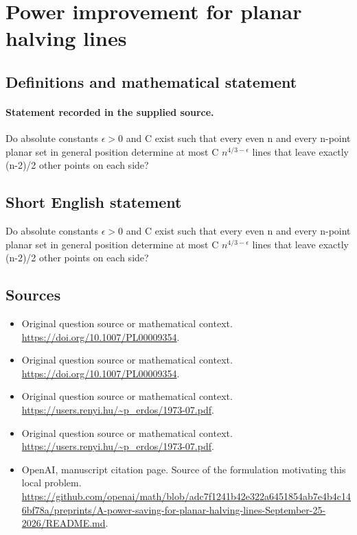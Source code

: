 \documentclass[11pt]{article}
\begin{document}
\section*{Power improvement for planar halving lines}\label{statement}
\subsection{Definitions and mathematical statement}
\paragraph{Statement recorded in the supplied source.}
Do absolute constants $\epsilon >0$ and C exist such that every even n and every n-point planar set in general position determine at most C $n^{4/3-\epsilon }$ lines that leave exactly (n-2)/2 other points on each side?
\subsection{Short English statement}
Do absolute constants $\epsilon >0$ and C exist such that every even n and every n-point planar set in general position determine at most C $n^{4/3-\epsilon }$ lines that leave exactly (n-2)/2 other points on each side?
\subsection{Sources}
\begin{itemize}
\item[S1] Original question source or mathematical context.
\url{https://doi.org/10.1007/PL00009354}.
\item[S2] Original question source or mathematical context.
\url{https://doi.org/10.1007/PL00009354}.
\item[S3] Original question source or mathematical context.
\url{https://users.renyi.hu/~p_erdos/1973-07.pdf}.
\item[S4] Original question source or mathematical context.
\url{https://users.renyi.hu/~p_erdos/1973-07.pdf}.
\item[S5] OpenAI, manuscript citation page. Source of the formulation motivating this local problem.
\url{https://github.com/openai/math/blob/adc7f1241b42e322a6451854ab7e4b4c146bf78a/preprints/A-power-saving-for-planar-halving-lines-September-25-2026/README.md}.
\end{itemize}
\end{document}
